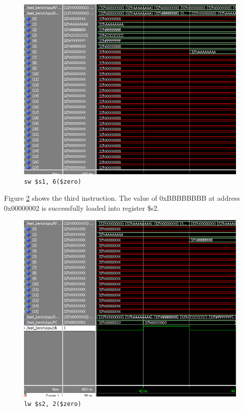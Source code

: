 \documentclass[12pt]{article}
\begin{document}
\begin{figure}[h!]
\centering
\includegraphics[width=\linewidth]{simulation/2-instr}
\caption{\texttt{sw \$s1, 6(\$zero)}}
\label{fig:2-instr}
\end{figure}
\clearpage
Figure \ref{fig:3-instr} shows the third instruction. The value of 0xBBBBBBBB at address 0x00000002 is successfully loaded into register \$s2.
\begin{figure}[h!]
\centering
\includegraphics[width=\linewidth]{simulation/3-instr}
\caption{\texttt{lw \$s2, 2(\$zero)}}
\label{fig:3-instr}
\end{figure}
\end{document}
